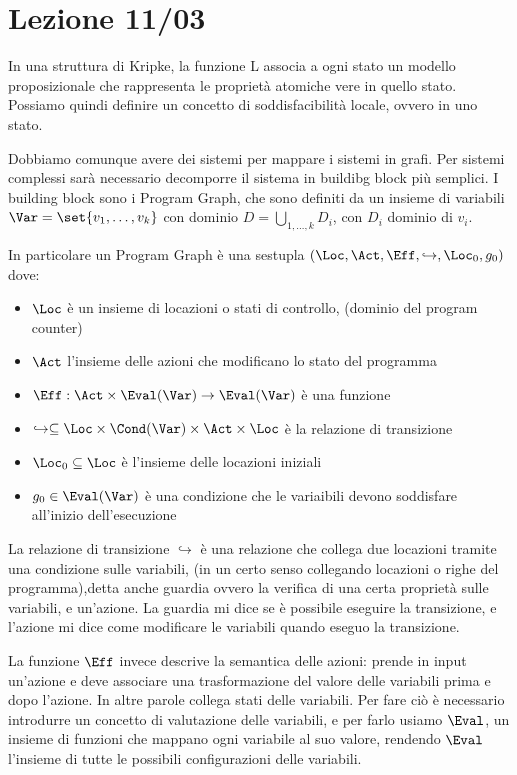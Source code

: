 \chapter{Lezione 11/03}

In una struttura di Kripke, la funzione L associa a ogni stato un modello proposizionale che rappresenta le proprietà atomiche vere in quello stato.
Possiamo quindi definire un concetto di soddisfacibilità locale, ovvero in uno stato.


Dobbiamo comunque avere dei sistemi per mappare i sistemi in grafi. Per sistemi complessi sarà necessario decomporre il sistema in buildibg block più semplici.
I building block  sono i Program Graph, che sono definiti da un insieme di variabili \(\Var = \set{v_1,\ldots,v_k}\) con dominio \(D = \bigcup_{1,\ldots,k} D_i\), con \(D_i\) dominio di \(v_i\).

In particolare un Program Graph è una sestupla \((\Loc,\Act,\Eff,\hookrightarrow , \Loc_0, g_0)\) dove:
\begin{itemize}
  \item \(\Loc\) è un insieme di locazioni o stati di controllo, (dominio del program counter)
  \item \(\Act\) l'insieme delle azioni che modificano lo stato del programma
  \item \(\Eff : \Act\times \Eval(\Var) \to \Eval(\Var)\) è una funzione
  \item \(\hookrightarrow \subseteq \Loc \times \Cond(\Var) \times \Act \times \Loc\) è la relazione di transizione
  \item \(\Loc_0 \subseteq \Loc\) è l'insieme delle locazioni iniziali
  \item \(g_0 \in \Eval(\Var)\) è una condizione che le variaibili devono soddisfare all'inizio dell'esecuzione
\end{itemize}
La relazione di transizione \(\hookrightarrow\) è una relazione che collega due locazioni tramite una condizione sulle variabili, (in un certo senso collegando  locazioni o righe del programma),detta anche guardia ovvero la verifica di una certa proprietà sulle variabili, e un'azione.
La guardia mi dice se è possibile eseguire la transizione, e l'azione mi dice come modificare le variabili quando eseguo la transizione.

La funzione \(\Eff\) invece descrive la semantica delle azioni: prende in input un'azione e deve associare una trasformazione del valore delle variabili prima e dopo l'azione. In altre parole collega  stati delle variabili.
Per fare ciò è necessario introdurre un concetto di valutazione delle variabili, e per farlo usiamo \(\Eval\), un insieme di funzioni che mappano ogni variabile al suo valore, rendendo \(\Eval\) l'insieme di tutte le possibili configurazioni delle variabili.

